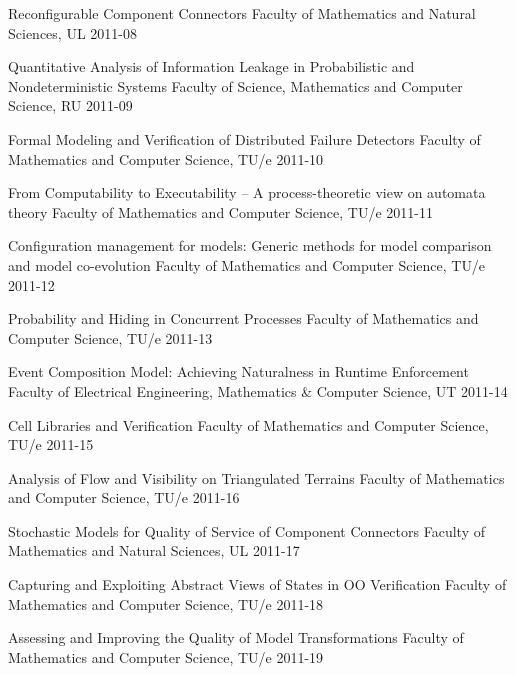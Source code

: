 \begin{multicols}{2}
         {Reconfigurable Component Connectors}
         {Faculty of Mathematics and Natural Sciences, UL}
         {2011-08}

         {Quantitative Analysis of Information Leakage in Probabilistic and Nondeterministic Systems}
         {Faculty of Science, Mathematics and Computer Science, RU}
         {2011-09}

         {Formal Modeling and Verification of Distributed Failure Detectors}
         {Faculty of Mathematics and Computer Science, TU/e}
         {2011-10}

         {From Computability to Executability -- A process-theoretic view on automata theory}
         {Faculty of Mathematics and Computer Science, TU/e}
         {2011-11}
         
         {Configuration management for models: Generic methods for model comparison and model co-evolution}
         {Faculty of Mathematics and Computer Science, TU/e}
         {2011-12}
 
         {Probability and Hiding in Concurrent Processes}
         {Faculty of Mathematics and Computer Science, TU/e}
         {2011-13}

         {Event Composition Model: Achieving Naturalness in Runtime Enforcement}
         {Faculty of Electrical Engineering, Mathematics \& Computer Science, UT}
         {2011-14}

         {Cell Libraries and Verification}
         {Faculty of Mathematics and Computer Science, TU/e}
         {2011-15}

         {Analysis of Flow and Visibility on Triangulated Terrains}
         {Faculty of Mathematics and Computer Science, TU/e}
         {2011-16}

         {Stochastic Models for Quality of Service of Component Connectors}
         {Faculty of Mathematics and Natural Sciences, UL}
         {2011-17}

         {Capturing and Exploiting Abstract Views of States in OO Verification}
         {Faculty of Mathematics and Computer Science, TU/e}
         {2011-18}

         {Assessing and Improving the Quality of Model Transformations}
         {Faculty of Mathematics and Computer Science, TU/e}
         {2011-19}


\end{multicols}
